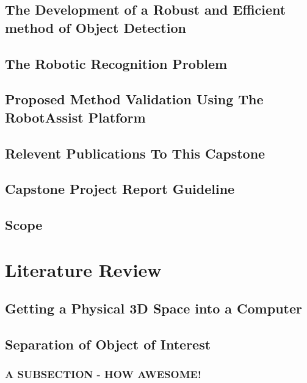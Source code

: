 \documentclass[12pt]{utscapstone}
\begin{document}
\section{The Development of a Robust and Efficient method of Object Detection}
\label{needfordetection}


\section{The Robotic Recognition Problem}
\label{recognitionproblem}


\section{Proposed Method Validation Using The RobotAssist Platform}
\label{methodvalidation}

\section{Relevent Publications To This Capstone}
\label{releventpublications}

\section{Capstone Project Report Guideline}
\label{projectguide}

\section{Scope}
\label{scope}

\chapter{Literature Review}
\label{litreview}

\section{Getting a Physical 3D Space into a Computer}
\label{3d3computer}


\section{Separation of Object of Interest}
\label{sec:objectseparating}


\subsection{A SUBSECTION - HOW AWESOME!}
\end{document}
